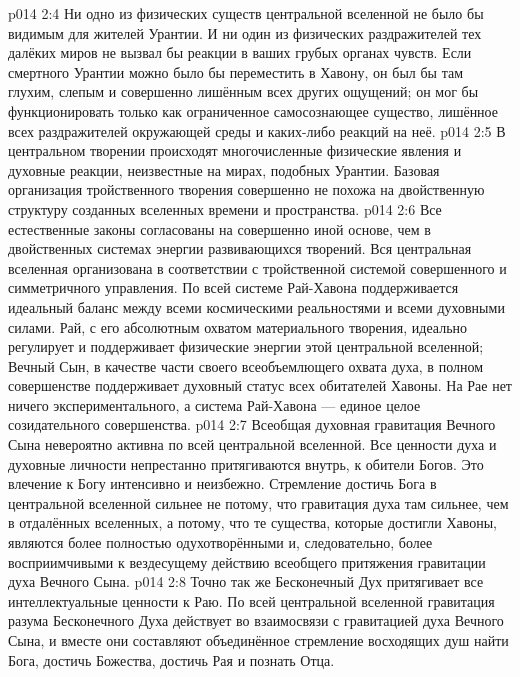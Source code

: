 \vs p014 2:4 Ни одно из физических существ центральной вселенной не было бы видимым для жителей Урантии. И ни один из физических раздражителей тех далёких миров не вызвал бы реакции в ваших грубых органах чувств. Если смертного Урантии можно было бы переместить в Хавону, он был бы там глухим, слепым и совершенно лишённым всех других ощущений; он мог бы функционировать только как ограниченное самосознающее существо, лишённое всех раздражителей окружающей среды и каких\hyp{}либо реакций на неё.
\vs p014 2:5 \pc В центральном творении происходят многочисленные физические явления и духовные реакции, неизвестные на мирах, подобных Урантии. Базовая организация тройственного творения совершенно не похожа на двойственную структуру созданных вселенных времени и пространства.
\vs p014 2:6 Все естественные законы согласованы на совершенно иной основе, чем в двойственных системах энергии развивающихся творений. Вся центральная вселенная организована в соответствии с тройственной системой совершенного и симметричного управления. По всей системе Рай\hyp{}Хавона поддерживается идеальный баланс между всеми космическими реальностями и всеми духовными силами. Рай, с его абсолютным охватом материального творения, идеально регулирует и поддерживает физические энергии этой центральной вселенной; Вечный Сын, в качестве части своего всеобъемлющего охвата духа, в полном совершенстве поддерживает духовный статус всех обитателей Хавоны. На Рае нет ничего экспериментального, а система Рай\hyp{}Хавона --- единое целое созидательного совершенства.
\vs p014 2:7 Всеобщая духовная гравитация Вечного Сына невероятно активна по всей центральной вселенной. Все ценности духа и духовные личности непрестанно притягиваются внутрь, к обители Богов. Это влечение к Богу интенсивно и неизбежно. Стремление достичь Бога в центральной вселенной сильнее не потому, что гравитация духа там сильнее, чем в отдалённых вселенных, а потому, что те существа, которые достигли Хавоны, являются более полностью одухотворёнными и, следовательно, более восприимчивыми к вездесущему действию всеобщего притяжения гравитации духа Вечного Сына.
\vs p014 2:8 Точно так же Бесконечный Дух притягивает все интеллектуальные ценности к Раю. По всей центральной вселенной гравитация разума Бесконечного Духа действует во взаимосвязи с гравитацией духа Вечного Сына, и вместе они составляют объединённое стремление восходящих душ найти Бога, достичь Божества, достичь Рая и познать Отца.
